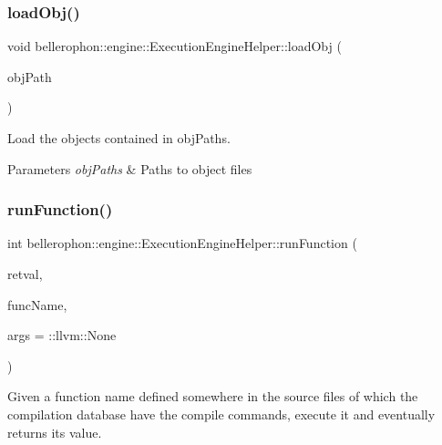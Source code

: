 \subsubsection{\texorpdfstring{load\+Obj()}{loadObj()}}
{\footnotesize\ttfamily void bellerophon\+::engine\+::\+Execution\+Engine\+Helper\+::load\+Obj (\begin{DoxyParamCaption}\item[{const \+::std\+::string \&}]{obj\+Path }\end{DoxyParamCaption})}



Load the objects contained in {\ttfamily obj\+Paths}. 


\begin{DoxyParams}{Parameters}
{\em obj\+Paths} & Paths to object files \\
\hline
\end{DoxyParams}
\hypertarget{classbellerophon_1_1engine_1_1ExecutionEngineHelper_a9f68c7cf6f58e299de0a06d96ada4fb2}{}\label{classbellerophon_1_1engine_1_1ExecutionEngineHelper_a9f68c7cf6f58e299de0a06d96ada4fb2} 
\subsubsection{\texorpdfstring{run\+Function()}{runFunction()}}
{\footnotesize\ttfamily int bellerophon\+::engine\+::\+Execution\+Engine\+Helper\+::run\+Function (\begin{DoxyParamCaption}\item[{\+::llvm\+::\+Generic\+Value \&}]{retval,  }\item[{\+::llvm\+::\+String\+Ref}]{func\+Name,  }\item[{\+::llvm\+::\+Array\+Ref$<$\+::llvm\+::\+Generic\+Value $>$}]{args = {\ttfamily \+:\+:llvm\+:\+:None} }\end{DoxyParamCaption})}



Given a function name defined somewhere in the source files of which the compilation database have the compile commands, execute it and eventually returns its value. 

